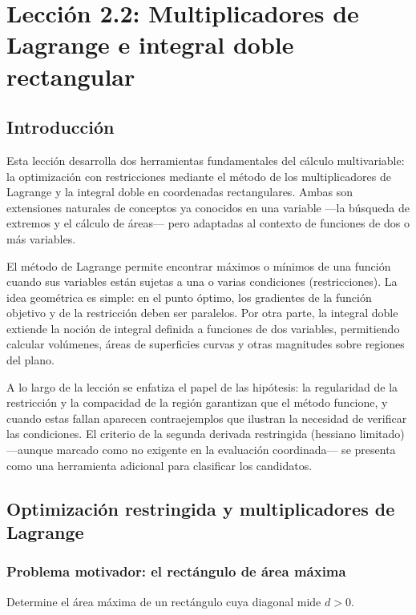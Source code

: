 \chapter{Lección 2.2: Multiplicadores de Lagrange e integral doble rectangular}

\section*{Introducción}

Esta lección desarrolla dos herramientas fundamentales del cálculo multivariable: la optimización con restricciones mediante el método de los multiplicadores de Lagrange y la integral doble en coordenadas rectangulares. Ambas son extensiones naturales de conceptos ya conocidos en una variable —la búsqueda de extremos y el cálculo de áreas— pero adaptadas al contexto de funciones de dos o más variables.

El método de Lagrange permite encontrar máximos o mínimos de una función cuando sus variables están sujetas a una o varias condiciones (restricciones). La idea geométrica es simple: en el punto óptimo, los gradientes de la función objetivo y de la restricción deben ser paralelos. Por otra parte, la integral doble extiende la noción de integral definida a funciones de dos variables, permitiendo calcular volúmenes, áreas de superficies curvas y otras magnitudes sobre regiones del plano.

A lo largo de la lección se enfatiza el papel de las hipótesis: la regularidad de la restricción y la compacidad de la región garantizan que el método funcione, y cuando estas fallan aparecen contraejemplos que ilustran la necesidad de verificar las condiciones. El criterio de la segunda derivada restringida (hessiano limitado) —aunque marcado como no exigente en la evaluación coordinada— se presenta como una herramienta adicional para clasificar los candidatos.

\section{Optimización restringida y multiplicadores de Lagrange}

\subsection{Problema motivador: el rectángulo de área máxima}

\begin{prob}
Determine el área máxima de un rectángulo cuya diagonal mide $d>0$.
\end{prob}


